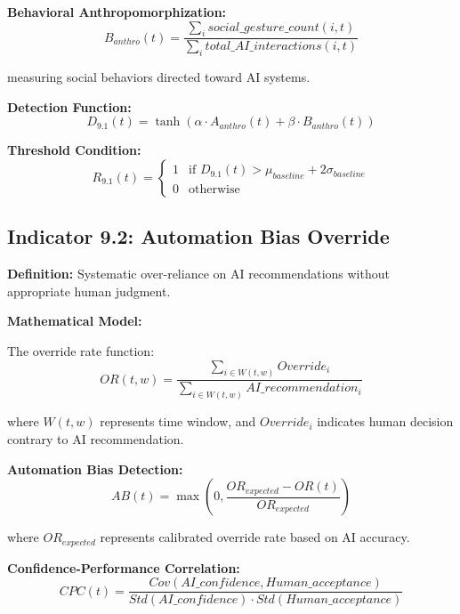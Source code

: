 \documentclass[11pt,a4paper]{article}
\begin{document}
\textbf{Behavioral Anthropomorphization:}
\begin{equation}
B_{anthro}(t) = \frac{\sum_{i} social\_gesture\_count(i,t)}{\sum_{i} total\_AI\_interactions(i,t)}
\end{equation}

measuring social behaviors directed toward AI systems.

\textbf{Detection Function:}
\begin{equation}
D_{9.1}(t) = \tanh(\alpha \cdot A_{anthro}(t) + \beta \cdot B_{anthro}(t))
\end{equation}

\textbf{Threshold Condition:}
\begin{equation}
R_{9.1}(t) = \begin{cases}
1 & \text{if } D_{9.1}(t) > \mu_{baseline} + 2\sigma_{baseline} \\
0 & \text{otherwise}
\end{cases}
\end{equation}

\subsection{Indicator 9.2: Automation Bias Override}

\textbf{Definition:} Systematic over-reliance on AI recommendations without appropriate human judgment.

\textbf{Mathematical Model:}

The override rate function:
\begin{equation}
OR(t,w) = \frac{\sum_{i \in W(t,w)} Override_i}{\sum_{i \in W(t,w)} AI\_recommendation_i}
\end{equation}

where $W(t,w)$ represents time window, and $Override_i$ indicates human decision contrary to AI recommendation.

\textbf{Automation Bias Detection:}
\begin{equation}
AB(t) = \max(0, \frac{OR_{expected} - OR(t)}{OR_{expected}})
\end{equation}

where $OR_{expected}$ represents calibrated override rate based on AI accuracy.

\textbf{Confidence-Performance Correlation:}
\begin{equation}
CPC(t) = \frac{Cov(AI\_confidence, Human\_acceptance)}{Std(AI\_confidence) \cdot Std(Human\_acceptance)}
\end{equation}
\end{document}
